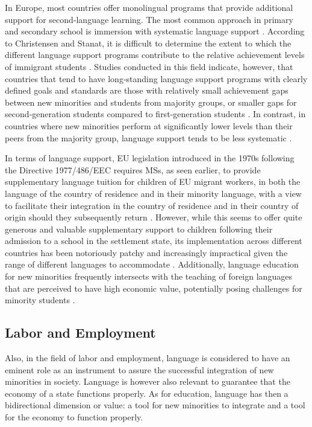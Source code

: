 \documentclass[output=paper,colorlinks,citecolor=brown]{langscibook}
\begin{document}
In Europe, most countries offer monolingual programs that provide additional support for second‐language learning. The most common approach in primary and secondary school is immersion with systematic language support \citep{christensen_stanat2007}. According to Christensen and Stanat, it is difficult to determine the extent to which the different language support programs contribute to the relative achievement levels of immigrant students \citep{christensen_stanat2007}. Studies conducted in this field indicate, however, that countries that tend to have long‐standing language support programs with clearly defined goals and standards are those with relatively small achievement gaps between new minorities and students from majority groups, or smaller gaps for second‐generation students compared to first‐generation students \citep{oecd2006}. In contrast, in countries where new minorities perform at significantly lower levels than their peers from the majority group, language support tends to be less systematic \citep{oecd2006}.

In terms of language support, EU legislation introduced in the 1970s following the Directive 1977/486/EEC requires MSs, as seen earlier, to provide supplementary language tuition for children of EU migrant workers, in both the language of the country of residence and in their minority language, with a view to facilitate their integration in the country of residence and in their country of origin should they subsequently return \citep{eu_coe_fra2015}. However, while this seems to offer quite generous and valuable supplementary support to children following their admission to a school in the settlement state, its implementation across different countries has been notoriously patchy and increasingly impractical given the range of different languages to accommodate \citep{eu_coe_fra2015}. Additionally, language education for new minorities frequently intersects with the teaching of foreign languages that are perceived to have high economic value, potentially posing challenges for minority students \citep{orourke_zhou2018}.

\subsection{Labor and Employment }\label{ch2.4.ss.4.2}

Also, in the field of labor and employment, language is considered to have an eminent role as an instrument to assure the successful integration of new minorities in society. Language is however also relevant to guarantee that the economy of a state functions properly. As for education, language has then a bidirectional dimension or value: a tool for new minorities to integrate and a tool for the economy to function properly.
\end{document}

